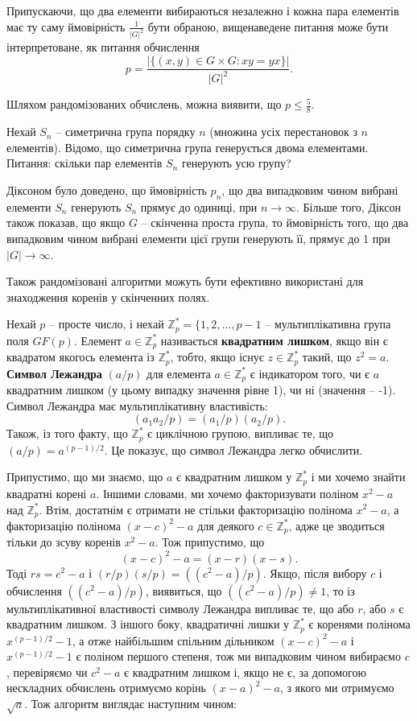 Припускаючи, що два елементи вибираються незалежно і кожна пара елементів має ту саму ймовірність $\frac{1}{|G|^2}$ бути обраною, вищенаведене питання може бути інтерпретоване, як питання обчислення
\[
p = \frac{|\{(x,y) \in G\times G: xy =yx\}|}{|G|^2}.
\]

Шляхом рандомізованих обчислень, можна виявити, що $p\leq \tfrac{5}{8}$.

Нехай $S_n$ -- симетрична група порядку $n$ (множина усіх перестановок з $n$ елементів). Відомо, що симетрична група генерується двома елементами. Питання: скільки пар елементів $S_n$ генерують усю групу?

Діксоном було доведено, що ймовірність $p_n$, що два випадковим чином вибрані елементи $S_n$ генерують $S_n$ прямує до одиниці, при $n \to \infty$. Більше того, Діксон також показав, що якщо $G$ -- скінченна проста група, то ймовірність того, що два випадковим чином вибрані елементи цієї групи генерують її, прямує до 1 при $|G|\to \infty$.

Також рандомізовані алгоритми можуть бути ефективно використані для знаходження коренів у скінченних полях.

Нехай $p$ -- просте число, і нехай $\mathbb{Z}_p^{*} = \{1,2,\ldots,p-1$ -- мультиплікативна група поля $GF(p)$. Елемент $a  \in \mathbb{Z}_p^{*}$ називається \textbf{квадратним лишком}, якщо він є квадратом якогось елемента із  $\mathbb{Z}_p^{*}$, тобто, якщо існує $z\in \mathbb{Z}_p^{*}$ такий, що $z^2 = a$. \textbf{Символ Лежандра} $(a/p)$ для елемента $a  \in \mathbb{Z}_p^{*}$ є індикатором того, чи є $a$ квадратним лишком (у цьому випадку значення рівне 1), чи ні (значення -- -1). Символ Лежандра має мультиплікативну властивість:
\[
(a_1a_2/p) = (a_1/p)(a_2/p).
\] 
Також, із того факту, що $\mathbb{Z}_p^{*}$ є циклічною групою, випливає те, що $(a/p)=a^{(p-1)/2}$. Це показує, що символ Лежандра легко обчислити.

Припустимо, що ми знаємо, що $a$ є квадратним лишком у $\mathbb{Z}_p^{*}$ і ми хочемо знайти квадратні корені $a$. Іншими словами, ми хочемо факторизувати поліном $x^2-a$ над $\mathbb{Z}_p^{*}$. Втім, достатнім є отримати не стільки факторизацію полінома $x^2 - a$, а факторизацію полінома $(x-c)^2-a$ для деякого $c \in \mathbb{Z}_p^{*}$, адже це зводиться тільки до зсуву коренів $x^2 - a$. Тож припустимо, що
\[
(x-c)^2 - a = (x-r)(x-s).
\]
Тоді $rs=c^2-a$ і $(r/p)(s/p)=((c^2-a)/p)$. Якщо, після вибору $c$ і обчислення $((c^2-a)/p)$, виявиться, що $((c^2-a)/p)\neq 1$, то із мультиплікативної властивості символу Лежандра випливає те, що або $r$, або $s$ є квадратним лишком. З іншого боку, квадратичні лишки у $\mathbb{Z}_p^*$ є коренями полінома $x^{(p-1)/2}-1$, а отже найбільшим спільним дільником $(x-c)^2-a$ і $x^{(p-1)/2}-1$ є поліном першого степеня, тож ми випадковим чином вибираємо $c$, перевіряємо чи $c^2-a$ є квадратним лишком і, якщо не є, за допомогою нескладних обчислень отримуємо корінь $(x-a)^2-a$, з якого ми отримуємо $\sqrt{a}$. Тож алгоритм виглядає наступним чином:

